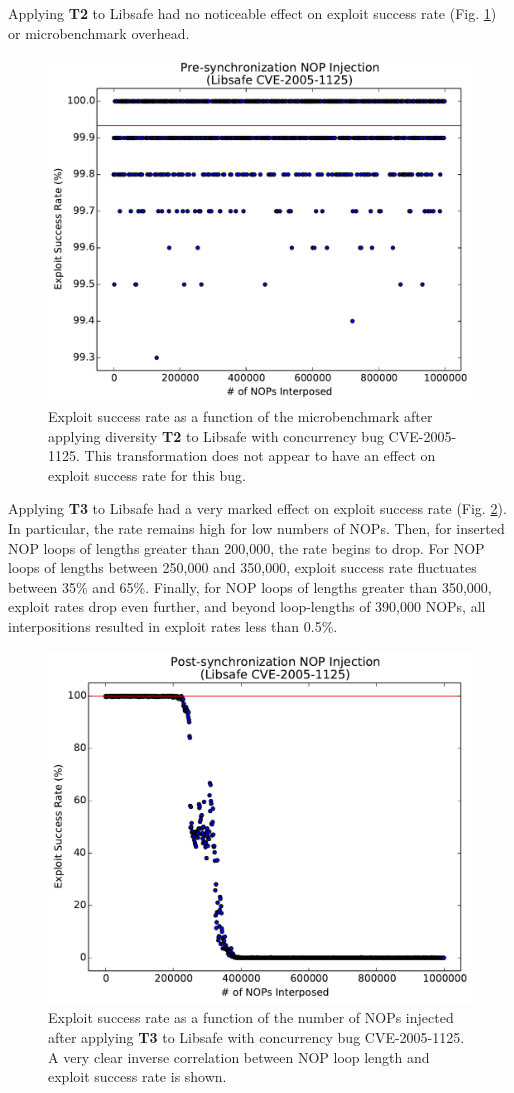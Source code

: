 Applying \textbf{T2} to Libsafe had no noticeable effect on exploit success rate (Fig. \ref{fig_libsafe-pre}) or microbenchmark overhead.
\begin{figure}
	\centering
	\includegraphics[width=.75\columnwidth]{figures/libsafe-pre}
	\caption{
		Exploit success rate as a function of the microbenchmark after applying diversity \textbf{T2} to Libsafe with concurrency bug CVE-2005-1125.
		This transformation does not appear to have an effect on exploit success rate for this bug.
	}
	\label{fig_libsafe-pre}
\end{figure}

Applying \textbf{T3} to Libsafe had a very marked effect on exploit success rate (Fig. \ref{fig_libsafe-post}).
In particular, the rate remains high for low numbers of NOPs.
Then, for inserted NOP loops of lengths greater than 200,000, the rate begins to drop.
For NOP loops of lengths between 250,000 and 350,000, exploit success rate fluctuates between 35\% and 65\%.
Finally, for NOP loops of lengths greater than 350,000, exploit rates drop even further, and beyond loop-lengths of 390,000 NOPs, all interpositions resulted in exploit rates less than 0.5\%.
\begin{figure}
	\centering
	\includegraphics[width=.75\columnwidth]{figures/libsafe-post}
	\caption{
		Exploit success rate as a function of the number of NOPs injected after applying \textbf{T3} to Libsafe with concurrency bug CVE-2005-1125.
		A very clear inverse correlation between NOP loop length and exploit success rate is shown.
	}
	\label{fig_libsafe-post}
\end{figure}

